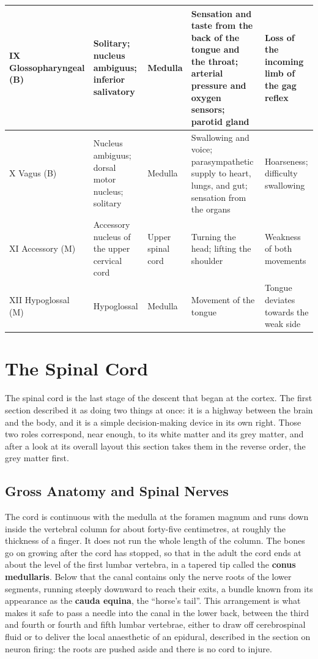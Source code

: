 \documentclass[11pt]{article}
\begin{document}
{\begin{longtable}{L{2.5cm} L{2.9cm} L{1.9cm} L{3.1cm} L{2.8cm}}
\midrule
IX Glosso\-pharyngeal (B) & Solitary; nucleus ambiguus; inferior salivatory & Medulla & Sensation and taste from the back of the tongue and the throat; arterial pressure and oxygen sensors; parotid gland & Loss of the incoming limb of the gag reflex \\
\midrule
X Vagus (B) & Nucleus ambiguus; dorsal motor nucleus; solitary & Medulla & Swallowing and voice; parasympathetic supply to heart, lungs, and gut; sensation from the organs & Hoarseness; difficulty swallowing \\
\midrule
XI Accessory (M) & Accessory nucleus of the upper cervical cord & Upper spinal cord & Turning the head; lifting the shoulder & Weakness of both movements \\
\midrule
XII Hypoglossal (M) & Hypoglossal & Medulla & Movement of the tongue & Tongue deviates towards the weak side \\
\end{longtable}
}


\section{The Spinal Cord}

The spinal cord is the last stage of the descent that began at the cortex. The first section described it as doing two things at once: it is a highway between the brain and the body, and it is a simple decision-making device in its own right. Those two roles correspond, near enough, to its white matter and its grey matter, and after a look at its overall layout this section takes them in the reverse order, the grey matter first.

\subsection{Gross Anatomy and Spinal Nerves}

The cord is continuous with the medulla at the foramen magnum and runs down inside the vertebral column for about forty-five centimetres, at roughly the thickness of a finger. It does not run the whole length of the column. The bones go on growing after the cord has stopped, so that in the adult the cord ends at about the level of the first lumbar vertebra, in a tapered tip called the \textbf{conus medullaris}. Below that the canal contains only the nerve roots of the lower segments, running steeply downward to reach their exits, a bundle known from its appearance as the \textbf{cauda equina}, the ``horse's tail''. This arrangement is what makes it safe to pass a needle into the canal in the lower back, between the third and fourth or fourth and fifth lumbar vertebrae, either to draw off cerebrospinal fluid or to deliver the local anaesthetic of an epidural, described in the section on neuron firing: the roots are pushed aside and there is no cord to injure.
\end{document}
